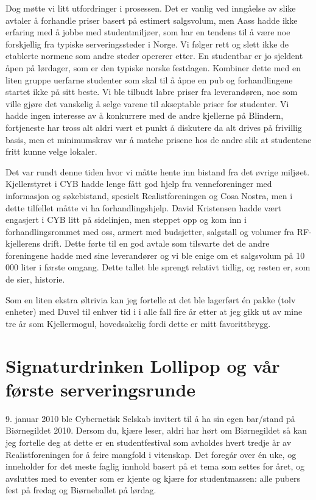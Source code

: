 Dog møtte vi litt utfordringer i prosessen. Det er vanlig ved inngåelse av slike avtaler å forhandle priser basert på estimert salgsvolum, men Aass hadde ikke erfaring med å jobbe med studentmiljøer, som har en tendens til å være noe forskjellig fra typiske serveringssteder i Norge. Vi følger rett og slett ikke de etablerte normene som andre steder opererer etter. En studentbar er jo sjeldent åpen på lørdager, som er den typiske norske festdagen. Kombiner dette med en liten gruppe uerfarne studenter som skal til å åpne en pub og forhandlingene startet ikke på sitt beste. Vi ble tilbudt labre priser fra leverandøren, noe som ville gjøre det vanskelig å selge varene til akseptable priser for studenter. Vi hadde ingen interesse av å konkurrere med de andre kjellerne på Blindern, fortjeneste har tross alt aldri vært et punkt å diskutere da alt drives på frivillig basis, men et minimumskrav var å matche prisene hos de andre slik at studentene fritt kunne velge lokaler.

Det var rundt denne tiden hvor vi måtte hente inn bistand fra det øvrige miljøet. Kjellerstyret i CYB hadde lenge fått god hjelp fra venneforeninger med informasjon og søkebistand, spesielt Realistforeningen og Cosa Nostra, men i dette tilfellet måtte vi ha forhandlingshjelp. David Kristensen hadde vært engasjert i CYB litt på sidelinjen, men steppet opp og kom inn i forhandlingsrommet med oss, armert med budsjetter, salgstall og volumer fra RF-kjellerens drift. Dette førte til en god avtale som tilsvarte det de andre foreningene hadde med sine leverandører og vi ble enige om et salgsvolum på 10 000 liter i første omgang. Dette tallet ble sprengt relativt tidlig, og resten er, som de sier, historie.

Som en liten ekstra øltrivia kan jeg fortelle at det ble lagerført én pakke (tolv enheter) med Duvel til enhver tid i i alle fall fire år etter at jeg gikk ut av mine tre år som Kjellermogul, hovedsakelig fordi dette er mitt favorittbrygg.

\section[Signaturdrinker]{Signaturdrinken Lollipop og vår første serveringsrunde}

9. januar 2010 ble Cybernetisk Selskab invitert til å ha sin egen bar/stand på Biørnegildet 2010. Dersom du, kjære leser, aldri har hørt om Biørnegildet så kan jeg fortelle deg at dette er en studentfestival som avholdes hvert tredje år av Realistforeningen for å feire mangfold i vitenskap. Det foregår over én uke, og inneholder for det meste faglig innhold basert på et tema som settes for året, og avsluttes med to eventer som er kjente og kjære for studentmassen: alle pubers fest på fredag og Biørneballet på lørdag.

